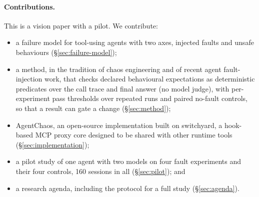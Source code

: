 \paragraph{Contributions.} This is a vision paper with a pilot. We contribute:
\begin{itemize}
\item a failure model for tool-using agents with two axes, injected faults and unsafe behaviours (\S\ref{sec:failure-model});
\item a method, in the tradition of chaos engineering and of recent agent fault-injection work, that checks declared behavioural expectations as deterministic predicates over the call trace and final answer (no model judge), with per-experiment pass thresholds over repeated runs and paired no-fault controls, so that a result can gate a change (\S\ref{sec:method});
\item AgentChaos, an open-source implementation built on switchyard, a hook-based MCP proxy core designed to be shared with other runtime tools (\S\ref{sec:implementation});
\item a pilot study of one agent with two models on four fault experiments and their four controls, 160 sessions in all (\S\ref{sec:pilot}); and
\item a research agenda, including the protocol for a full study (\S\ref{sec:agenda}).
\end{itemize}

